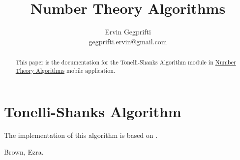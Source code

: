 \documentclass[12pt,oneside,a4paper]{article}
\title{Number Theory Algorithms}
\author{Ervin Gegprifti \\ [6pt]
	gegprifti.ervin@gmail.com}
\date{}
\begin{document}
\pagecolor{bgcolor}

\maketitle

\begin{abstract}
	This paper is the documentation for the Tonelli-Shanks Algorithm module in \href{https://play.google.com/store/apps/details?id=com.gegprifti.android.numbertheoryalgorithms}{Number Theory Algorithms} mobile application.
\end{abstract}

\section*{Tonelli-Shanks Algorithm}	
 The implementation of this algorithm is based on \cite{brown1999square}.




\begin{thebibliography}{}
	
	Brown, Ezra.
	\newblock \href{http://www.math.vt.edu/people/brown/doc/sqrts.pdf}{}
\end{thebibliography}

\end{document}
